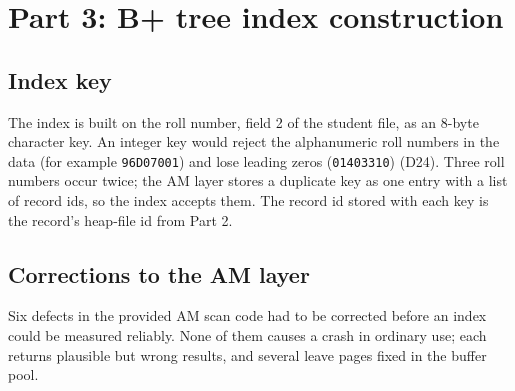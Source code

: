 \documentclass[11pt,a4paper]{article}
\begin{document}
\section{Part 3: B+ tree index construction}
\label{sec:part3}

\subsection{Index key}

The index is built on the roll number, field 2 of the student file, as an 8-byte character key. An integer key would reject the alphanumeric roll numbers in the data (for example \texttt{96D07001}) and lose leading zeros (\texttt{01403310}) (D24). Three roll numbers occur twice; the AM layer stores a duplicate key as one entry with a list of record ids, so the index accepts them. The record id stored with each key is the record's heap-file id from Part 2.

\subsection{Corrections to the AM layer}

Six defects in the provided AM scan code had to be corrected before an index could be measured reliably. None of them causes a crash in ordinary use; each returns plausible but wrong results, and several leave pages fixed in the buffer pool.
\end{document}
